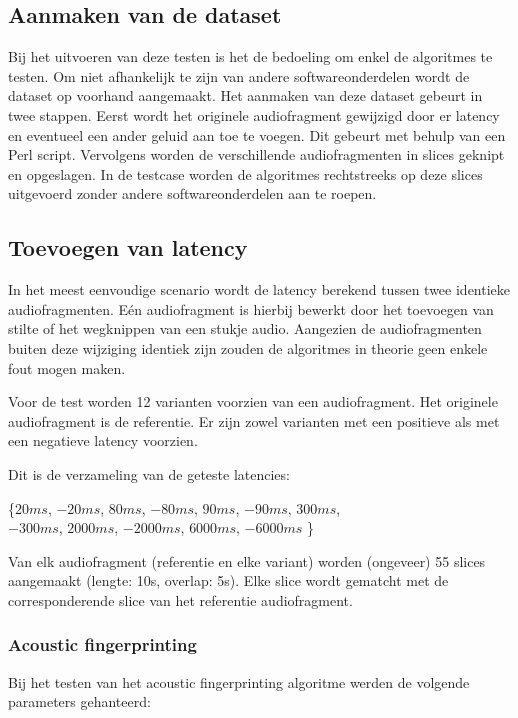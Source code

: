\subsection{Aanmaken van de dataset}

Bij het uitvoeren van deze testen is het de bedoeling om enkel de algoritmes te testen. Om niet afhankelijk te zijn van andere softwareonderdelen wordt de dataset op voorhand aangemaakt. Het aanmaken van deze dataset gebeurt in twee stappen. Eerst wordt het originele audiofragment gewijzigd door er latency en eventueel een ander geluid aan toe te voegen. Dit gebeurt met behulp van een Perl script. Vervolgens worden de verschillende audiofragmenten in slices geknipt en opgeslagen. In de testcase worden de algoritmes rechtstreeks op deze slices uitgevoerd zonder andere softwareonderdelen aan te roepen.

\subsection{Toevoegen van latency}
\label{latency-test}

In het meest eenvoudige scenario wordt de latency berekend tussen twee identieke audiofragmenten. Eén audiofragment is hierbij bewerkt door het toevoegen van stilte of het wegknippen van een stukje audio. Aangezien de audiofragmenten buiten deze wijziging identiek zijn zouden de algoritmes in theorie geen enkele fout mogen maken.

Voor de test worden 12 varianten voorzien van een audiofragment. Het originele audiofragment is de referentie. Er zijn zowel varianten met een positieve als met een negatieve latency voorzien.

Dit is de verzameling van de geteste latencies:
\begin{center}
	\{$20ms$, $-20ms$, $80ms$, $-80ms$, $90ms$, $-90ms$, $300ms$,\\ $-300ms$, $2000ms$, $-2000ms$, $6000ms$, $-6000ms$ \}
\end{center}

Van elk audiofragment (referentie en elke variant) worden (ongeveer) 55 slices aangemaakt (lengte: 10s, overlap: 5s). Elke slice wordt gematcht met de corresponderende slice van het referentie audiofragment.

\subsubsection{Acoustic fingerprinting}

Bij het testen van het acoustic fingerprinting algoritme werden de volgende parameters gehanteerd:

